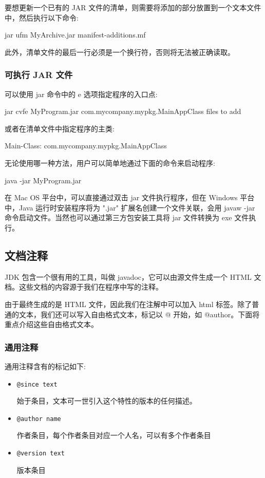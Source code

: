 要想更新一个已有的 JAR 文件的清单，则需要将添加的部分放置到一个文本文件中，然后执行以下命令:

\begin{Java}
jar ufm MyArchive.jar manifest-additions.mf
\end{Java}

此外，清单文件的最后一行必须是一个换行符，否则将无法被正确读取。

\subsubsection{可执行 JAR 文件}

可以使用 jar 命令中的 e 选项指定程序的入口点:

\begin{Java}
jar cvfe MyProgram.jar com.mycompany.mypkg.MainAppClass files to add
\end{Java}

或者在清单文件中指定程序的主类:
\begin{Java}
Main-Class: com.mycompany.mypkg.MainAppClass
\end{Java}

无论使用哪一种方法，用户可以简单地通过下面的命令来启动程序:
\begin{Java}
java -jar MyProgram.jar
\end{Java}

在 Mac OS 平台中，可以直接通过双击 jar 文件执行程序，但在 Windows 平台中，Java 运行时安装程序将为 ".jar" 扩展名创建一个文件关联，会用 javaw -jar 命令启动文件。当然也可以通过第三方包安装工具将 jar 文件转换为 exe 文件执行。

\subsection{文档注释}

JDK 包含一个很有用的工具，叫做 javadoc，它可以由源文件生成一个 HTML 文档。这些文档的内容源于我们在程序中写的注释。

由于最终生成的是 HTML 文件，因此我们在注解中可以加入 html 标签。除了普通的文本，我们还可以写入自由格式文本，标记以 @ 开始，如 @author。下面将重点介绍这些自由格式文本。

\subsubsection{通用注释}

通用注释含有的标记如下:
\begin{itemize}
    \item \texttt{@since text}
    
    始于条目，文本可一世引入这个特性的版本的任何描述。

    \item \texttt{@author name}
    
    作者条目，每个作者条目对应一个人名，可以有多个作者条目

    \item \texttt{@version text}
    
    版本条目
\end{itemize}

